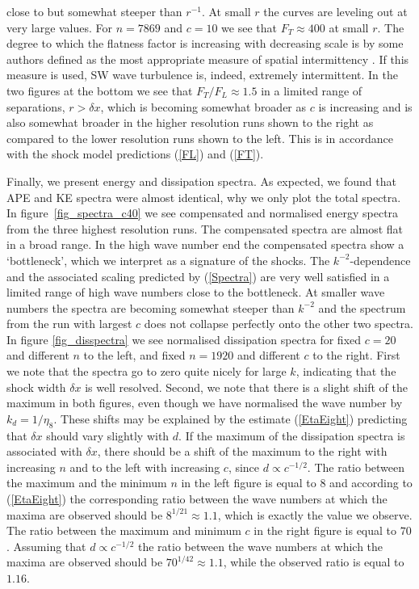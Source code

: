\documentclass{jfm}
\begin{document}
close to but somewhat steeper than $ r^{-1} $. At small $ r $ the curves are
leveling out at very large values. For $ n = 7869 $ and $ c = 10 $ we see that
$ F_{T} \approx 400 $ at small $ r $. The degree to which the flatness factor
is increasing with decreasing scale is by some authors defined as the most
appropriate measure of spatial intermittency \cite[see for example][]{Frisch}.
If this measure is used, SW wave turbulence is, indeed, extremely intermittent.
In the two figures at the bottom we see that $ F_{T}/F_{L} \approx 1.5 $ in a
limited range of separations, $ r > \delta x $, which is becoming somewhat
broader as $ c $ is increasing and is also somewhat broader in the higher
resolution runs shown to the right as compared to the lower resolution runs
shown to the left. This is in accordance with the shock model predictions
(\ref{FL}) and (\ref{FT}).

Finally, we present energy and dissipation spectra. As expected, we found that APE and KE
spectra were almost identical, why we only plot the
total spectra. In figure~\ref{fig_spectra_c40} we see  compensated and
normalised energy spectra from the three highest resolution runs. The
compensated spectra are almost flat in a broad range. In the high wave number
end the compensated spectra show a `bottleneck', which we interpret as a
signature of the shocks. The $ k^{-2} $-dependence and the associated scaling predicted
by (\ref{Spectra}) are very well satisfied in a limited range of high wave
numbers close to the bottleneck. At smaller wave numbers the spectra are
becoming somewhat steeper than $ k^{-2} $ and the spectrum from the run with
largest $ c $ does not collapse perfectly onto the other two spectra.  In figure \ref{fig_disspectra}
 we see normalised dissipation spectra for fixed $ c= 20 $ and different $ n $ to the left, and fixed $ n = 1920 $
and different $ c $ to the right. First we note that the spectra go to zero quite nicely for large $ k $, indicating that the shock width $ \delta x $ is well resolved. Second, we note that there is a slight shift of the maximum in both figures, even though we have normalised the wave number by $ k_d = 1/\eta_8 $.   These shifts may be explained by the estimate (\ref{EtaEight}) predicting that $ \delta x $ should vary slightly with $ d $. If the maximum of the dissipation spectra is associated with $ \delta x $, there should be a shift of the maximum  to the right with increasing $ n $ and to the left with increasing $ c $, since $ d \propto c^{-1/2} $.
 The ratio between the maximum and the minimum $ n $ in the left figure is equal to 8 and  according to (\ref{EtaEight}) the corresponding ratio between the wave numbers at which the maxima are observed should be $ 8^{1/21} \approx 1.1 $, which is exactly the value we observe. The ratio between the maximum and minimum $ c $ in the right figure is equal to $ 70 $. Assuming that $ d \propto c^{-1/2} $ the ratio between the wave numbers at which the maxima are observed should be $ 70^{1/42} \approx 1.1 $, while the observed ratio is equal to $ 1.16 $. 
\end{document}
